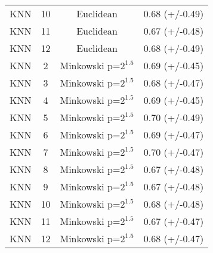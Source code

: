\documentclass{article}
\begin{document}
\begin{tabular}{cccc}
      KNN &         10 &              Euclidean &  0.68 (+/-0.49) \\
      KNN &         11 &              Euclidean &  0.67 (+/-0.48) \\
      KNN &         12 &              Euclidean &  0.68 (+/-0.49) \\
      KNN &          2 &  Minkowski p=$2^{1.5}$ &  0.69 (+/-0.45) \\
      KNN &          3 &  Minkowski p=$2^{1.5}$ &  0.68 (+/-0.47) \\
      KNN &          4 &  Minkowski p=$2^{1.5}$ &  0.69 (+/-0.45) \\
      KNN &          5 &  Minkowski p=$2^{1.5}$ &  0.70 (+/-0.49) \\
      KNN &          6 &  Minkowski p=$2^{1.5}$ &  0.69 (+/-0.47) \\
      KNN &          7 &  Minkowski p=$2^{1.5}$ &  0.70 (+/-0.47) \\
      KNN &          8 &  Minkowski p=$2^{1.5}$ &  0.67 (+/-0.48) \\
      KNN &          9 &  Minkowski p=$2^{1.5}$ &  0.67 (+/-0.48) \\
      KNN &         10 &  Minkowski p=$2^{1.5}$ &  0.68 (+/-0.48) \\
      KNN &         11 &  Minkowski p=$2^{1.5}$ &  0.67 (+/-0.47) \\
      KNN &         12 &  Minkowski p=$2^{1.5}$ &  0.68 (+/-0.47) \\
      \bottomrule
      \end{tabular}        
\end{document}
